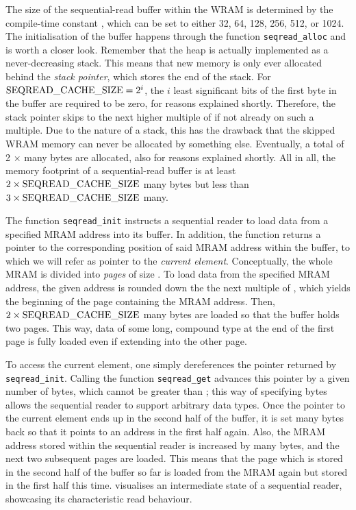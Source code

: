 The size of the sequential-read buffer within the WRAM is determined by the compile-time constant \seqreadcachesize{}, which can be set to either 32, 64, 128, 256, 512, or 1024.
The initialisation of the buffer happens through the function \lstinline|seqread_alloc| and is worth a closer look.
Remember that the heap is actually implemented as a never-decreasing stack.
This means that new memory is only ever allocated behind the \emph{stack pointer}, which stores the end of the stack.
For \(\seqreadcachesize{} = 2^i\), the \(i\) least significant bits of the first byte in the buffer are required to be zero, for reasons explained shortly.
Therefore, the stack pointer skips to the next higher multiple of \seqreadcachesize{} if not already on such a multiple.
Due to the nature of a stack, this has the drawback that the skipped WRAM memory can never be allocated by something else.
Eventually, a total of 2 × \seqreadcachesize{} many bytes are allocated, also for reasons explained shortly.
All in all, the memory footprint of a sequential-read buffer is at least \(2 \times \seqreadcachesize{}\) many bytes but less than \(3 \times \seqreadcachesize{}\) many.

The function \lstinline|seqread_init| instructs a sequential reader to load data from a specified MRAM address into its buffer.
In addition, the function returns a pointer to the corresponding position of said MRAM address within the buffer, to which we will refer as pointer to the \emph{current element}.
Conceptually, the whole MRAM is divided into \emph{pages} of size \seqreadcachesize{}.
To load data from the specified MRAM address, the given address is rounded down the the next multiple of \seqreadcachesize{}, which yields the beginning of the page containing the MRAM address.
Then, \(2 \times \seqreadcachesize{}\) many bytes are loaded so that the buffer holds two pages.
This way, data of some long, compound type at the end of the first page is fully loaded even if extending into the other page.

To access the current element, one simply dereferences the pointer returned by \lstinline|seqread_init|.
Calling the function \lstinline|seqread_get| advances this pointer by a given number of bytes, which cannot be greater than \seqreadcachesize{};
this way of specifying bytes allows the sequential reader to support arbitrary data types.
Once the pointer to the current element ends up in the second half of the buffer, it is set \seqreadcachesize{} many bytes back so that it points to an address in the first half again.
Also, the MRAM address stored within the sequential reader is increased by \seqreadcachesize{} many bytes, and the next two subsequent pages are loaded.
This means that the page which is stored in the second half of the buffer so far is loaded from the MRAM again but stored in the first half this time.
 visualises an intermediate state of a sequential reader, showcasing its characteristic read behaviour.

